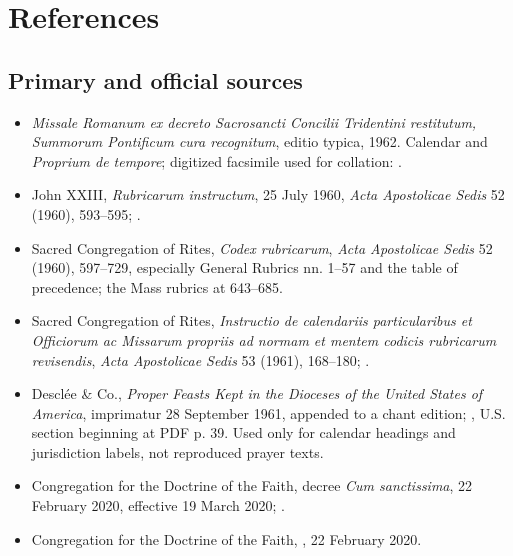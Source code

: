 \section{References}

\subsection{Primary and official sources}

\begin{itemize}[leftmargin=1.5em,itemsep=0.45em]
\item \emph{Missale Romanum ex decreto Sacrosancti Concilii Tridentini restitutum, Summorum Pontificum cura recognitum}, editio typica, 1962. Calendar and \emph{Proprium de tempore}; digitized facsimile used for collation: .
\item John XXIII, \emph{Rubricarum instructum}, 25 July 1960, \emph{Acta Apostolicae Sedis} 52 (1960), 593--595; .
\item Sacred Congregation of Rites, \emph{Codex rubricarum}, \emph{Acta Apostolicae Sedis} 52 (1960), 597--729, especially General Rubrics nn. 1--57 and the table of precedence; the Mass rubrics at 643--685.
\item Sacred Congregation of Rites, \emph{Instructio de calendariis particularibus et Officiorum ac Missarum propriis ad normam et mentem codicis rubricarum revisendis}, \emph{Acta Apostolicae Sedis} 53 (1961), 168--180; .
\item Desclée \& Co., \emph{Proper Feasts Kept in the Dioceses of the United States of America}, imprimatur 28 September 1961, appended to a chant edition; , U.S. section beginning at PDF p. 39. Used only for calendar headings and jurisdiction labels, not reproduced prayer texts.
\item Congregation for the Doctrine of the Faith, decree \emph{Cum sanctissima}, 22 February 2020, effective 19 March 2020; .
\item Congregation for the Doctrine of the Faith, , 22 February 2020.
\end{itemize}

